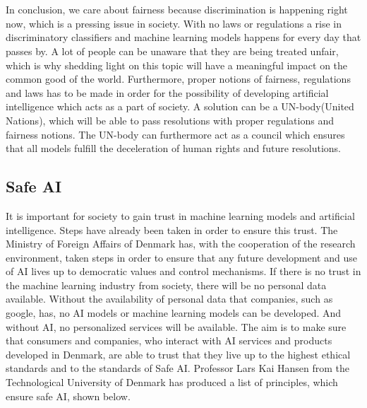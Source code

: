 \documentclass[11pt, fleqn, titlepage]{article}
\begin{document}
	\\\\
	In conclusion, we care about fairness because discrimination is happening right now, which is a pressing issue in society. With no laws or regulations a rise in discriminatory classifiers and machine learning models happens for every day that passes by. A lot of people can be unaware that they are being treated unfair, which is why shedding light on this topic will have a meaningful impact on the common good of the world. Furthermore, proper notions of fairness, regulations and laws has to be made in order for the possibility of developing artificial intelligence which acts as a part of society. A solution can be a UN-body(United Nations), which will be able to pass resolutions with proper regulations and fairness notions. The UN-body can furthermore act as a council which ensures that all models fulfill the deceleration of human rights and future resolutions. 
	
	
	
	
	\subsection{Safe AI}\label{safeai}
	It is important for society to gain trust in machine learning models and artificial intelligence. Steps have already been taken in order to ensure this trust. The Ministry of Foreign Affairs of Denmark has, with the cooperation of the research environment, taken steps in order to ensure that any future development and use of AI lives up to democratic values and control mechanisms. If there is no trust in the machine learning industry from society, there will be no personal data available. Without the availability of personal data that companies, such as google, has, no AI models or machine learning models can be developed. And without AI, no personalized services will be available. The aim is to make sure that consumers and companies, who interact with AI services and products developed in Denmark, are able to trust that they live up to the highest ethical standards and to the standards of Safe AI. \cite{larsk} Professor Lars Kai Hansen from the Technological University of Denmark has produced a list of principles, which ensure safe AI, shown  below. 
	
\end{document}
